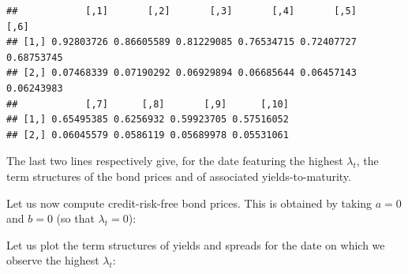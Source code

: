 \documentclass[
  12pt,
]{book}
\newenvironment{Shaded}{\begin{snugshade}}{\end{snugshade}}
\newcommand{\AttributeTok}[1]{\textcolor[rgb]{0.13,0.29,0.53}{#1}}
\newcommand{\DecValTok}[1]{\textcolor[rgb]{0.00,0.00,0.81}{#1}}
\newcommand{\FloatTok}[1]{\textcolor[rgb]{0.00,0.00,0.81}{#1}}
\newcommand{\FunctionTok}[1]{\textcolor[rgb]{0.13,0.29,0.53}{\textbf{#1}}}
\newcommand{\NormalTok}[1]{#1}
\newcommand{\OtherTok}[1]{\textcolor[rgb]{0.56,0.35,0.01}{#1}}
\newcommand{\SpecialCharTok}[1]{\textcolor[rgb]{0.81,0.36,0.00}{\textbf{#1}}}
\theoremstyle{definition}
\theoremstyle{definition}
\theoremstyle{definition}
\theoremstyle{definition}
\theoremstyle{remark}
\begin{document}
\begin{verbatim}
##            [,1]       [,2]       [,3]       [,4]       [,5]       [,6]
## [1,] 0.92803726 0.86605589 0.81229085 0.76534715 0.72407727 0.68753745
## [2,] 0.07468339 0.07190292 0.06929894 0.06685644 0.06457143 0.06243983
##            [,7]      [,8]       [,9]      [,10]
## [1,] 0.65495385 0.6256932 0.59923705 0.57516052
## [2,] 0.06045579 0.0586119 0.05689978 0.05531061
\end{verbatim}

The last two lines respectively give, for the date featuring the highest \(\lambda_t\), the term structures of the bond prices and of associated yields-to-maturity.

Let us now compute credit-risk-free bond prices. This is obtained by taking \(a=0\) and \(b=0\) (so that \(\lambda_t=0\)):

\begin{Shaded}
\end{Shaded}

Let us plot the term structures of yields and spreads for the date on which we observe the highest \(\lambda_t\):
\end{document}
